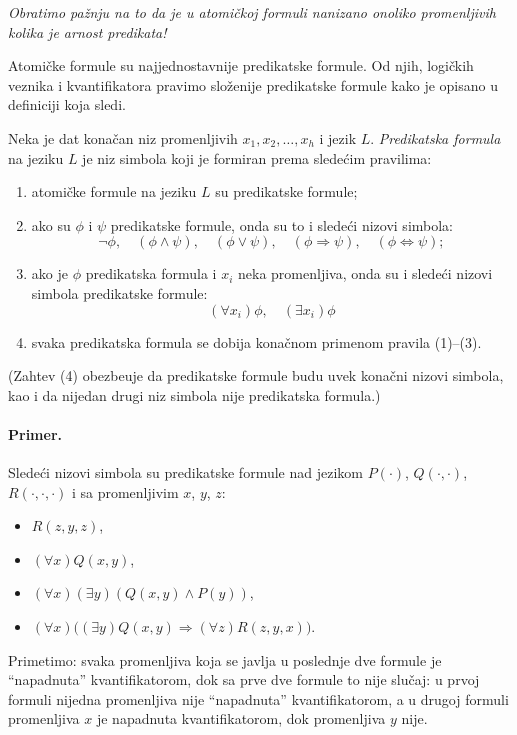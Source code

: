 \begin{NAP}\it
  Obratimo pa\v znju na to da je u atomi\v ckoj formuli nanizano onoliko promenljivih kolika je arnost predikata!
\end{NAP}

Atomi\v cke formule su najjednostavnije predikatske formule. Od njih, logi\v ckih veznika i kvantifikatora pravimo
slo\v zenije predikatske formule kako je opisano u definiciji koja sledi.

\begin{DEF}
  Neka je dat kona\v can niz promenljivih $x_1, x_2, \ldots, x_h$ i jezik $L$.
  \emph{Predikatska formula} na jeziku $L$ je niz simbola koji je formiran prema slede\'cim pravilima:
  \begin{enumerate}\itemsep -1mm
  \item
    atomi\v cke formule na jeziku $L$ su predikatske formule;
  \item
    ako su $\phi$ i $\psi$ predikatske formule, onda su to i slede\'ci nizovi simbola:
    $$
      \lnot \phi, \quad (\phi \land \psi), \quad (\phi \lor \psi), \quad (\phi \Rightarrow \psi), \quad (\phi \Leftrightarrow \psi);
    $$
  \item
    ako je $\phi$ predikatska formula i $x_i$ neka promenljiva, onda su i slede\'ci nizovi simbola predikatske formule:
    $$
      (\forall x_i)\phi, \quad (\exists x_i)\phi
    $$
  \item
    svaka predikatska formula se dobija kona\v cnom primenom pravila (1)--(3).
  \end{enumerate}
  (Zahtev (4) obezbe\dj uje da predikatske formule budu uvek kona\v cni nizovi simbola, kao i da nijedan drugi niz
  simbola nije predikatska formula.)
\end{DEF}

\paragraph{Primer.} Slede\'ci nizovi simbola su predikatske formule nad jezikom $P(\cdot)$, $Q(\cdot, \cdot)$, $R(\cdot, \cdot, \cdot)$
i sa promenljivim $x$, $y$, $z$:
\begin{itemize}
\item $R(z, y, z)$,
\item $(\forall x) Q(x, y)$,
\item $(\forall x)(\exists y)(Q(x, y) \land P(y))$,
\item $(\forall x)\big((\exists y) Q(x, y) \Rightarrow (\forall z) R(z, y, x)\big)$.
\end{itemize}
Primetimo: svaka promenljiva koja se javlja u poslednje dve formule je \enquote{napadnuta} kvantifikatorom,
dok sa prve dve formule to nije slu\v caj: u prvoj formuli nijedna promenljiva nije \enquote{napadnuta} kvantifikatorom,
a u drugoj formuli promenljiva $x$ je napadnuta kvantifikatorom, dok promenljiva $y$ nije.

